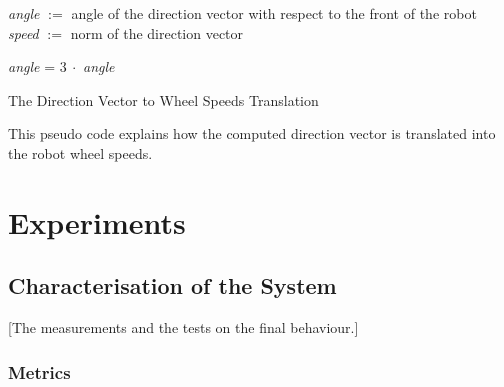\documentclass[oneside, a4paper, 12pt]{memoir}
\let\oldCaption\caption
\renewcommand{\caption}[2]{
\oldCaption[#1]{{\small\sffamily\bfseries #1:} #2}
}
\begin{document}
		\begin{algorithm}
			\textcolor{gray}{}
			\emph{angle} $:=$ angle of the direction vector with respect to the front of the robot\;
			\emph{speed} $:=$ norm of the direction vector\;
			
			\BlankLine
	
			\textcolor{gray}{}
			
			\BlankLine
			
			\textcolor{gray}{}
			\emph{angle} = $3~\cdot$ \emph{angle}\;
	
			\BlankLine
			
			\textcolor{gray}{}
			
			\BlankLine
			
			\textcolor{gray}{}
			
					\caption{The Direction Vector to Wheel Speeds Translation}{This pseudo code explains how the computed direction vector is translated into the robot wheel speeds.}
		\label{fig:direction_vector_wheel_speeds_translation}
		\end{algorithm}
		

	


\chapter{Experiments}
\label{chap:experiments}

	\section{Characterisation of the System}
	[The measurements and the tests on the final behaviour.]

		\subsection{Metrics}
		
\end{document}
